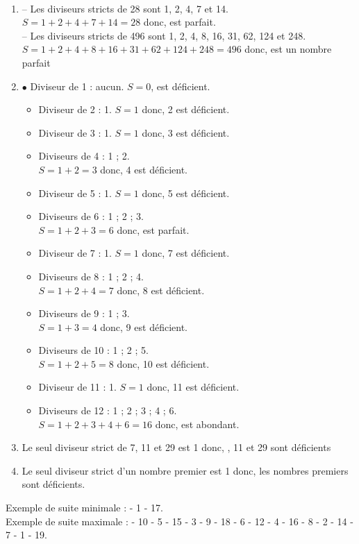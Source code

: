 \begin{colonne*exercice}
\begin{corrige}
   \ \\ [-5mm]
   \begin{enumerate}
      \item -- Les diviseurs stricts de 28 sont 1, 2, 4, 7 et 14. \\
         $S =1+2+4+7+14 =28$ donc, { est parfait}. \\
         -- Les diviseurs stricts de 496 sont 1, 2, 4, 8, 16, 31, 62, 124 et 248. $S =1+2+4+8+16+31+62+124+248 =496$ donc, { est un nombre parfait}
      \item \textcolor{G1}{$\bullet$} Diviseur de 1 : aucun. $S =0$, { est déficient}.
      \begin{itemize}
         \item Diviseur de 2 : 1. $S =1$ donc, 2 est déficient.
         \item Diviseur de 3 : 1. $S =1$ donc, 3 est déficient.
         \item Diviseurs de 4 : 1 ; 2. \\
            $S =1+2 =3$ donc, 4 est déficient.
         \item Diviseur de 5 : 1. $S =1$ donc, 5 est déficient.
         \item Diviseurs de 6 : 1 ; 2 ; 3. \\
            $S =1+2+3 =6$ donc, { est parfait}.
         \item Diviseur de 7 : 1. $S =1$ donc, 7 est déficient.
         \item Diviseurs de 8 : 1 ; 2 ; 4. \\
            $S =1+2+4 =7$ donc, 8 est déficient.
         \item Diviseurs de 9 : 1 ; 3. \\
            $S =1+3 =4$ donc, 9 est déficient.
         \item Diviseurs de 10 : 1 ; 2 ; 5. \\
            $S =1+2+5 =8$ donc, 10 est déficient.
         \item Diviseur de 11 : 1. $S =1$ donc, 11 est déficient.
         \item Diviseurs de 12 : 1 ; 2 ; 3 ; 4 ; 6. \\
            $S =1+2+3+4+6 =16$ donc, { est abondant}.
      \end{itemize}
      \item Le seul diviseur strict de 7, 11 et 29 est 1 donc, {, 11 et 29 sont déficients}
      \item Le seul diviseur strict d'un nombre premier est 1 donc, {\blue les nombres premiers sont déficients}.
   \end{enumerate}
   
\bigskip
{}
\smallskip

Exemple de suite minimale : { - 1 - 17}. \\
Exemple de suite maximale : { - 10 - 5 - 15 - 3 - 9 - 18 - 6 - 12 - 4 - 16 - 8 - 2 - 14 - 7 - 1 - 19}. \\
\end{corrige}

\end{colonne*exercice}


